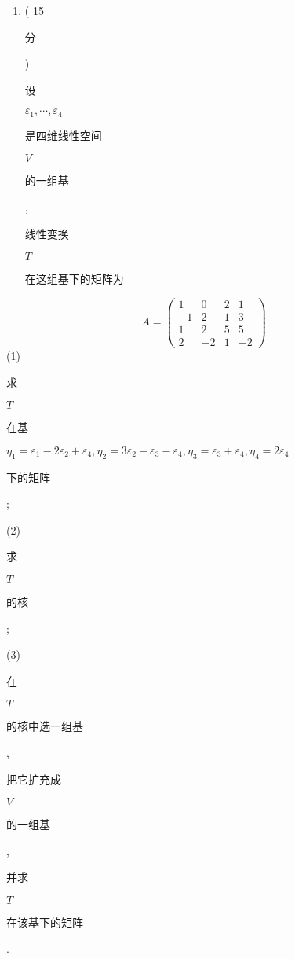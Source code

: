 \documentclass[10pt]{article}
\begin{document}
\begin{enumerate}
  \item ( 15 \begin{CJK}{UTF8}{mj}分\end{CJK}) \begin{CJK}{UTF8}{mj}设\end{CJK} $\varepsilon_{1}, \cdots, \varepsilon_{4}$ \begin{CJK}{UTF8}{mj}是四维线性空间\end{CJK} $V$ \begin{CJK}{UTF8}{mj}的一组基\end{CJK}, \begin{CJK}{UTF8}{mj}线性变换\end{CJK} $T$ \begin{CJK}{UTF8}{mj}在这组基下的矩阵为\end{CJK}

\end{enumerate}
$$
A=\left(\begin{array}{cccc}
1 & 0 & 2 & 1 \\
-1 & 2 & 1 & 3 \\
1 & 2 & 5 & 5 \\
2 & -2 & 1 & -2
\end{array}\right)
$$
(1) \begin{CJK}{UTF8}{mj}求\end{CJK} $T$ \begin{CJK}{UTF8}{mj}在基\end{CJK} $\eta_{1}=\varepsilon_{1}-2 \varepsilon_{2}+\varepsilon_{4}, \eta_{2}=3 \varepsilon_{2}-\varepsilon_{3}-\varepsilon_{4}, \eta_{3}=\varepsilon_{3}+\varepsilon_{4}, \eta_{4}=2 \varepsilon_{4}$ \begin{CJK}{UTF8}{mj}下的矩阵\end{CJK};

(2) \begin{CJK}{UTF8}{mj}求\end{CJK} $T$ \begin{CJK}{UTF8}{mj}的核\end{CJK};

(3) \begin{CJK}{UTF8}{mj}在\end{CJK} $T$ \begin{CJK}{UTF8}{mj}的核中选一组基\end{CJK}, \begin{CJK}{UTF8}{mj}把它扩充成\end{CJK} $V$ \begin{CJK}{UTF8}{mj}的一组基\end{CJK}, \begin{CJK}{UTF8}{mj}并求\end{CJK} $T$ \begin{CJK}{UTF8}{mj}在该基下的矩阵\end{CJK}.
\end{document}
